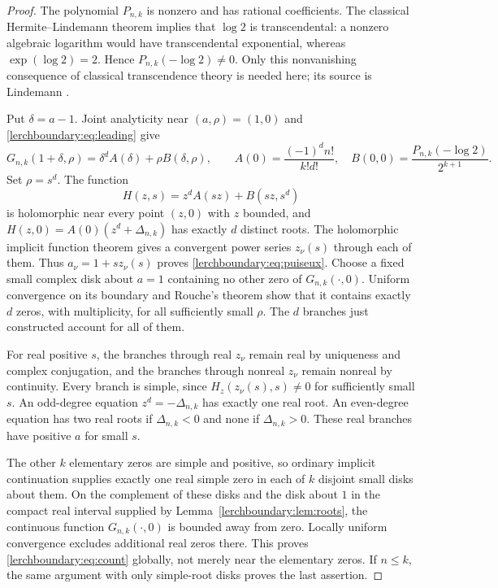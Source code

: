\begin{proof}
The polynomial $P_{n,k}$ is nonzero and has rational coefficients.
The classical Hermite--Lindemann theorem implies that $\log2$ is
transcendental: a nonzero algebraic logarithm would have transcendental
exponential, whereas $\exp(\log2)=2$. Hence
$P_{n,k}(-\log2)\neq0$.  Only this nonvanishing consequence of classical
transcendence theory is needed here; its source is Lindemann \cite{Lindemann1882}.

Put $\delta=a-1$.  Joint analyticity near $(a,\rho)=(1,0)$ and
\eqref{lerchboundary:eq:leading} give
\begin{equation}\label{lerchboundary:eq:local}
 G_{n,k}(1+\delta,\rho)
   =\delta^d A(\delta)+\rho B(\delta,\rho),\qquad
 A(0)=\frac{(-1)^d n!}{k!d!},\quad
 B(0,0)=\frac{P_{n,k}(-\log2)}{2^{k+1}}.
\end{equation}
Set $\rho=s^d$. The function
\[
 H(z,s)=z^d A(sz)+B(sz,s^d)
\]
is holomorphic near every point $(z,0)$ with $z$ bounded, and
$H(z,0)=A(0)(z^d+\Delta_{n,k})$ has exactly $d$ distinct roots.
The holomorphic implicit function theorem gives a convergent power
series $z_\nu(s)$ through each of them. Thus
$a_\nu=1+s z_\nu(s)$ proves \eqref{lerchboundary:eq:puiseux}.
Choose a fixed small complex disk about $a=1$ containing no other
zero of $G_{n,k}(\cdot,0)$.  Uniform convergence on its boundary and
Rouche's theorem show that it contains exactly $d$ zeros, with
multiplicity, for all sufficiently small $\rho$.  The $d$ branches
just constructed account for all of them.

For real positive $s$, the branches through real $z_\nu$ remain real
by uniqueness and complex conjugation, and the branches through
nonreal $z_\nu$ remain nonreal by continuity. Every branch is simple,
since $H_z(z_\nu(s),s)\neq0$ for sufficiently small $s$.  An odd-degree
equation $z^d=-\Delta_{n,k}$ has exactly one real root. An even-degree
equation has two real roots if $\Delta_{n,k}<0$ and none if
$\Delta_{n,k}>0$.  These real branches have positive $a$ for small $s$.

The other $k$ elementary zeros are simple and positive, so ordinary
implicit continuation supplies exactly one real simple zero in each
of $k$ disjoint small disks about them.  On the complement of these
disks and the disk about $1$ in the compact real interval supplied
by Lemma~\ref{lerchboundary:lem:roots}, the continuous function
$G_{n,k}(\cdot,0)$ is bounded away from zero.  Locally uniform
convergence excludes additional real zeros there.  This proves
\eqref{lerchboundary:eq:count} globally, not merely near the elementary
zeros.  If $n\leq k$, the same argument with only simple-root disks
proves the last assertion.
\end{proof}

